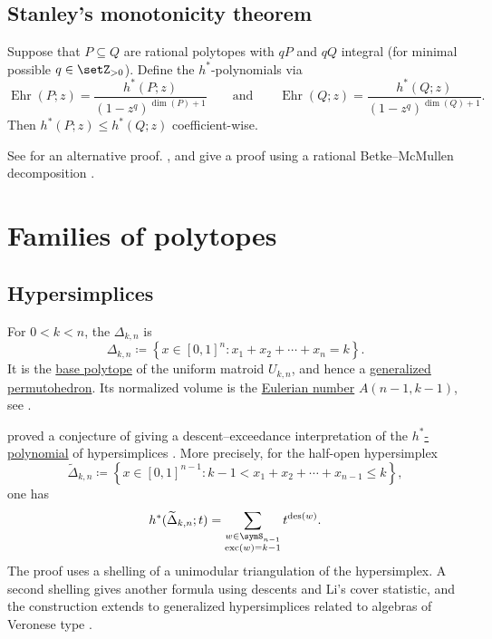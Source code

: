 \subsection[stanleyMonotonicity]{Stanley's monotonicity theorem}

\begin{theorem}
Suppose that $P \subseteq Q$ are rational polytopes with $qP$
and $qQ$ integral (for minimal possible $q \in \setZ_{>0}$).
Define the $h^*$-polynomials via
\[
 \operatorname{Ehr}(P;z) = \frac{h^*(P;z)}{(1-z^q)^{\dim(P)+1}}
 \qquad \text{and} \qquad
 \operatorname{Ehr}(Q;z) = \frac{h^*(Q;z)}{(1-z^q)^{\dim(Q)+1}}.
\]
Then $h^*(P;z) \leq h^*(Q;z)$ coefficient-wise.
\end{theorem}
See \cite{Beck2007} for an alternative proof.
,  and
 give a proof using a rational
Betke--McMullen decomposition \cite[Thm.~3.3]{BeckBraunVindasMelendez2022}.


\section[polytopeFamilies]{Families of polytopes}


\subsection[hypersimplex]{Hypersimplices}

For $0<k<n$, the \label{hypersimplexDefinition}
$\Delta_{k,n}$ is
\[
  \Delta_{k,n}
  \coloneqq
  \left\{ x\in[0,1]^n : x_1+x_2+\dotsb+x_n=k \right\}.
\]
It is the \hyperref[matroidBasePolytope]{base polytope} of the uniform
matroid $U_{k,n}$, and hence a
\hyperref[generalizedPermutohedron]{generalized permutohedron}.
Its normalized volume is the
\hyperref[eulerianPolynomial]{Eulerian number} $A(n-1,k-1)$, see
.

 proved a conjecture of  giving a
descent--exceedance interpretation of the
\hyperref[hStarPolynomial]{$h^*$-polynomial} of hypersimplices
\cite{Li2012}.  More precisely, for the half-open hypersimplex
\[
  \widetilde{\Delta}_{k,n}
  \coloneqq
  \left\{
    x\in[0,1]^{n-1} :
    k-1 < x_1+x_2+\dotsb+x_{n-1} \leq k
  \right\},
\]
one has
\[
  h^*(\widetilde{\Delta}_{k,n};t)
  =
  \sum_{\substack{w\in\symS_{n-1}\\
                  \operatorname{exc}(w)=k-1}}
  t^{\operatorname{des}(w)}.
\]
The proof uses a shelling of a unimodular triangulation of the hypersimplex.
A second shelling gives another formula using descents and Li's cover
statistic, and the construction extends to generalized hypersimplices related
to algebras of Veronese type \cite[Thms.~1.2, 1.3 and 7.3]{Li2012}.


